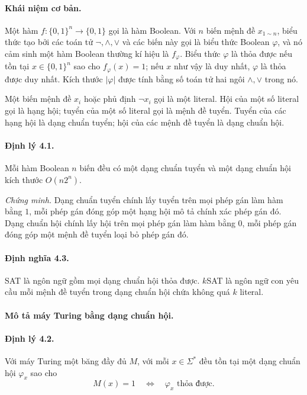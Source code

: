 \documentclass[11pt]{article}
\begin{document}
\paragraph{Khái niệm cơ bản.}
Một hàm \(f:\{0,1\}^n\to\{0,1\}\) gọi là hàm Boolean. Với \(n\) biến mệnh đề
\(x_{1\sim n}\), biểu thức tạo bởi các toán tử \(\neg,\land,\lor\) và các biến
này gọi là biểu thức Boolean \(\varphi\), và nó cảm sinh một hàm Boolean
thường kí hiệu là \(f_{\varphi}\). Biểu thức \(\varphi\) là thỏa được nếu tồn
tại \(x\in\{0,1\}^n\) sao cho \(f_{\varphi}(x)=1\); nếu \(x\) như vậy là duy
nhất, \(\varphi\) là thỏa được duy nhất. Kích thước \(|\varphi|\) được tính
bằng số toán tử hai ngôi \(\land,\lor\) trong nó.

Một biến mệnh đề \(x_i\) hoặc phủ định \(\neg x_i\) gọi là một literal. Hội của
một số literal gọi là hạng hội; tuyển của một số literal gọi là mệnh đề tuyển.
Tuyển của các hạng hội là dạng chuẩn tuyển; hội của các mệnh đề tuyển là dạng
chuẩn hội.

\paragraph{Định lý 4.1.}
Mỗi hàm Boolean \(n\) biến đều có một dạng chuẩn tuyển và một dạng chuẩn hội
kích thước \(O(n2^n)\).

\emph{Chứng minh.}
Dạng chuẩn tuyển chính lấy tuyển trên mọi phép gán làm hàm bằng \(1\), mỗi
phép gán đóng góp một hạng hội mô tả chính xác phép gán đó. Dạng chuẩn hội
chính lấy hội trên mọi phép gán làm hàm bằng \(0\), mỗi phép gán đóng góp một
mệnh đề tuyển loại bỏ phép gán đó.

\paragraph{Định nghĩa 4.3.}
SAT là ngôn ngữ gồm mọi dạng chuẩn hội thỏa được. \(k\)SAT là ngôn ngữ con yêu
cầu mỗi mệnh đề tuyển trong dạng chuẩn hội chứa không quá \(k\) literal.

\paragraph{Mô tả máy Turing bằng dạng chuẩn hội.}

\paragraph{Định lý 4.2.}
Với máy Turing một băng đầy đủ \(M\), với mỗi \(x\in\Sigma^*\) đều tồn tại một
dạng chuẩn hội \(\varphi_x\) sao cho
\[
  M(x)=1\quad\Longleftrightarrow\quad \varphi_x\text{ thỏa được.}
\]
\end{document}
